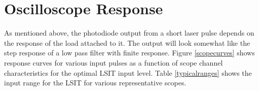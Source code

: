 \documentclass{article}
\begin{document}
\section{Oscilloscope Response}
As mentioned above, the photodiode output from a short laser pulse depends on the response of the load attached to it. The output will look somewhat like the step response of a low pass filter with finite response. Figure \ref{scopecurves} shows response curves for various input pulses as a function of scope channel characteristics for the optimal LSIT input level. Table \ref{typicalranges} shows the input range for the LSIT for various representative scopes.
\end{document}
